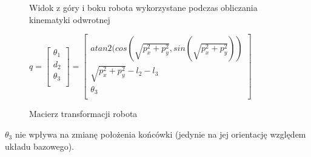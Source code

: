 \begin{figure}[H]
	\centering
	\caption{Widok z góry i boku robota wykorzystane podczas obliczania kinematyki odwrotnej} 
\end{figure}    

\begin{figure}[H]
\centering

$q=
\begin{bmatrix}
\theta _1 \\
d_2 \\
\theta_3 \\
\end{bmatrix}  
=
\begin{bmatrix}
atan2(cos(\sqrt{p_x^2+p_y^2},sin(\sqrt{p_x^2+p_y^2}))\\
\sqrt{p_x^2+p_y^2}-l_2-l_3\\
\theta_3 \\
\end{bmatrix}  $


\caption{Macierz transformacji robota} 
\end{figure} 
$ \theta_3$ nie wpływa na zmianę położenia końcówki (jedynie na jej orientację względem układu bazowego). 